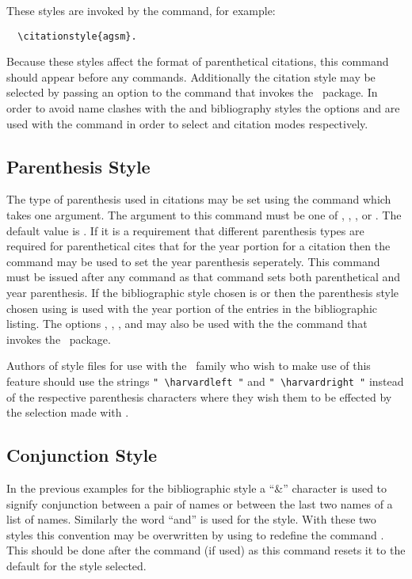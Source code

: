 These styles are invoked by the  command,
for example:
\begin{verbatim}
  \citationstyle{agsm}.
\end{verbatim}
Because these styles affect the format of parenthetical citations, this command 
should appear before any  commands.
Additionally the
citation style may be selected by passing an option to the
 command that invokes the \harvard\ package.
In order to avoid name clashes with the  and 
bibliography styles the options  and  are
used with the  command in order to select 
and  citation modes respectively.

\subsection{Parenthesis Style}
The type of parenthesis used in citations may be set using the
command which takes one argument.
The argument to this command must be one of
, , ,  or
.
The default value is .
If it is a requirement that different parenthesis types are required for
parenthetical cites that for the year portion for a 
citation then the command  may be
used to set the year parenthesis seperately.
This command must be issued after any  command
as that command sets both parenthetical and year parenthesis.
If the bibliographic style chosen is  or  then the parenthesis
style chosen using  is used with the
year portion of the entries in the bibliographic listing.
The options , , , 
and  may also be used with the the  command
that invokes the \harvard\ package.

Authors of style files for use with the \harvard\ family who wish to make
use of this feature should use the strings \verb+" \harvardleft "+ and
\verb+" \harvardright "+ instead of the respective parenthesis characters where
they wish them to be effected by the selection made with
.

\subsection{Conjunction Style}
In the previous examples for the  bibliographic
style a ``\&'' character is used to signify conjunction between a pair of names
or between the last two names of a list of names.
Similarly the word ``and'' is used for the  style.
With these two styles this convention may be overwritten by using
 to redefine the command
.
This should be done after the  command
(if used) as this
command resets it to the default for the style selected.


